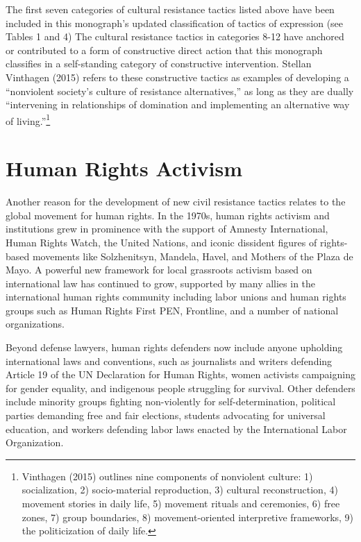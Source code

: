 \documentclass[twoside,a4paper,12pt,fleqn,openany]{extbook}
\begin{document}
The first seven categories of cultural resistance tactics listed above have been included in this monograph’s updated classification of tactics of expression (see Tables 1 and 4) The cultural resistance tactics in categories 8-12 have anchored or contributed to a form of constructive direct action that this monograph classifies in a self-standing category of constructive intervention. Stellan Vinthagen (2015) refers to these constructive tactics as examples of developing a “nonviolent society’s culture of resistance alternatives,” as long as they are dually “intervening in relationships of domination and implementing an alternative way of living.”\footnote{Vinthagen (2015) outlines nine components of nonviolent culture: 1) socialization, 2) socio-material reproduction, 3) cultural reconstruction, 4) movement stories in daily life, 5) movement rituals and ceremonies, 6) free zones, 7) group boundaries, 8) movement-oriented interpretive frameworks, 9) the politicization of daily life.}

\section*{Human Rights Activism}

Another reason for the development of new civil resistance tactics relates to the global movement for human rights. In the 1970s, human rights activism and institutions grew in prominence with the support of Amnesty International, Human Rights Watch, the United Nations, and iconic dissident figures of rights-based movements like Solzhenitsyn, Mandela, Havel, and Mothers of the Plaza de Mayo. A powerful new framework for local grassroots activism based on international law has continued to grow, supported by many allies in the international human rights community including labor unions and human rights groups such as Human Rights First PEN, Frontline, and a number of national organizations.

Beyond defense lawyers, human rights defenders now include anyone upholding international laws and conventions, such as journalists and writers defending Article 19 of the UN Declaration for Human Rights, women activists campaigning for gender equality, and indigenous people struggling for survival. Other defenders include minority groups fighting non-violently for self-determination, political parties demanding free and fair elections, students advocating for universal education, and workers defending labor laws enacted by the International Labor Organization.
\end{document}
